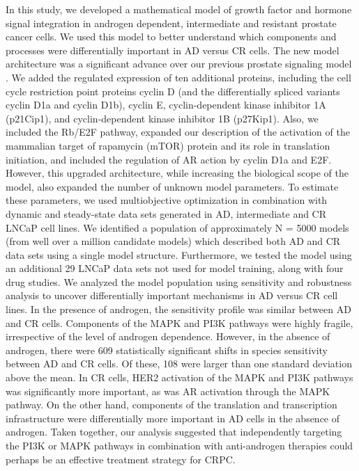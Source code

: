 \documentclass[12pt]{article}
\begin{document}
In this study, we developed a mathematical model of growth factor and hormone signal integration in androgen dependent, intermediate and resistant prostate cancer cells. 
We used this model to better understand which components and processes were differentially important in AD versus CR cells.
The new model architecture was a significant advance over our previous prostate signaling model \citep{Tasseff2010}. 
We added the regulated expression of ten additional proteins, including the cell cycle restriction point proteins cyclin D (and the differentially spliced variants cyclin D1a and cyclin D1b), cyclin E, cyclin-dependent kinase inhibitor 1A (p21Cip1), and cyclin-dependent kinase inhibitor 1B (p27Kip1). 
Also, we included the Rb/E2F pathway, expanded our description of the activation of the mammalian target of rapamycin (mTOR) protein and its role in translation initiation, and included the regulation of AR action by cyclin D1a and E2F. 
However, this upgraded architecture, while increasing the biological scope of the model, also expanded the number of unknown model parameters. 
To estimate these parameters, we used multiobjective optimization in combination with dynamic and steady-state data sets generated in AD, intermediate and CR LNCaP cell lines. 
We identified a population of approximately N = 5000 models (from well over a million candidate models) which described both AD and CR data sets using a single model structure.
Furthermore, we tested the model using an additional 29 LNCaP data sets not used for model training, along with four drug studies.
We analyzed the model population using sensitivity and robustness analysis to uncover differentially important mechanisms in AD versus CR cell lines. 
In the presence of androgen, the sensitivity profile was similar between AD and CR cells. 
Components of the MAPK and PI3K pathways were highly fragile, irrespective of the level of androgen dependence. 
However, in the absence of androgen, there were 609 statistically significant shifts in species sensitivity between AD and CR cells.
Of these, 108 were larger than one standard deviation above the mean.
In CR cells, HER2 activation of the MAPK and PI3K pathways was significantly more important, as was AR activation through the MAPK pathway. 
On the other hand, components of the translation and transcription infrastructure were differentially more important in AD cells in the absence of androgen.  
Taken together, our analysis suggested that independently targeting the PI3K or MAPK pathways in combination with anti-androgen therapies could perhaps be an effective treatment strategy for CRPC. 
\end{document}
